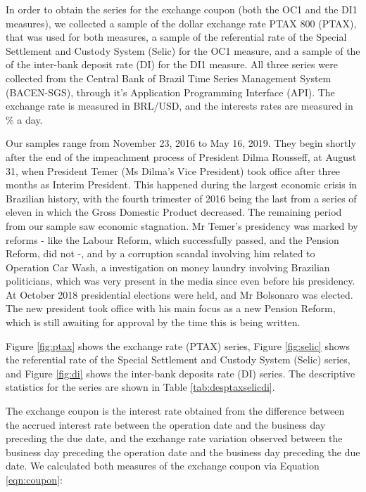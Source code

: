 \documentclass[cic,tc, english]{iiufrgs}
\begin{document}
    In order to obtain the series for the exchange coupon (both the OC1 and the DI1 measures), we collected a sample of the dollar exchange rate PTAX 800 (PTAX), that was used for both measures, a sample of the referential rate of the Special Settlement and Custody System (Selic) for the OC1 measure, and a sample of the of the inter-bank deposit rate (DI) for the DI1 measure. All three series were collected from the Central Bank of Brazil Time Series Management System (BACEN-SGS), through it's Application Programming Interface (API). The exchange rate is measured in BRL/USD, and the interests rates are measured in \% a day.
    
    Our samples range from November 23, 2016 to May 16, 2019. They begin shortly after the end of the impeachment process of President Dilma Rousseff, at August 31, when President Temer (Ms Dilma's Vice President) took office after three months as Interim President. This happened during the largest economic crisis in Brazilian history, with the fourth trimester of 2016 being the last from a series of eleven in which the Gross Domestic Product decreased. The remaining period from our sample saw economic stagnation. Mr Temer's presidency was marked by reforms - like the Labour Reform, which successfully passed, and the Pension Reform, did not -, and by a corruption scandal involving him related to Operation Car Wash, a investigation on money laundry involving Brazilian politicians, which was very present in the media since even before his presidency. At October 2018 presidential elections were held, and Mr Bolsonaro was elected. The new president took office with his main focus as a new Pension Reform, which is still awaiting for approval by the time this is being written.
    

    Figure \ref{fig:ptax} shows the exchange rate (PTAX) series, Figure \ref{fig:selic} shows the referential rate of the Special Settlement and Custody System (Selic) series, and Figure \ref{fig:di} shows the inter-bank deposits rate (DI) series. The descriptive statistics for the series are shown in Table \ref{tab:desptaxselicdi}.

    

    

    

    

    The exchange coupon is the interest rate obtained from the difference between the accrued interest rate between the operation date and the business day preceding the due date, and the exchange rate variation observed between the business day preceding the operation date and the business day preceding the due date. We calculated both measures of the exchange coupon via Equation \ref{eqn:coupon}:
\end{document}

